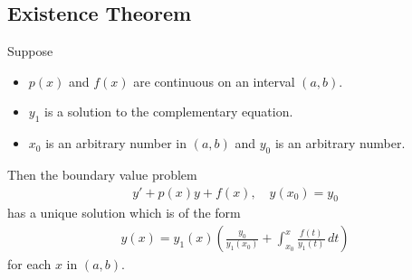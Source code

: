 \documentclass[12pt,a4paper]{article}
\begin{document}
	\vspace*{16pt}
	
\subsection{Existence Theorem}
Suppose
	\begin{itemize}
	\item $p(x)$ and $f(x)$ are continuous on an interval $(a, b)$.
	\item $y_1$ is a solution to the complementary equation.
	\item $x_0$ is an arbitrary number in $(a, b)$ and $y_0$ is an arbitrary number.
	\end{itemize}
Then the boundary value problem
	\begin{align*}
	y' + p(x) y + f(x) , \quad y(x_0) = y_0
	\end{align*}
has a unique solution which is of the form
	\begin{align*}
	y (x) = y_1 (x) \left( \frac{y_0}{y_1 (x_0)} + \int_{x_0}^x \frac{f(t)}{y_1 (t)} \, dt \right)
	\end{align*}
for each $x$ in $(a, b)$.
\end{document}

